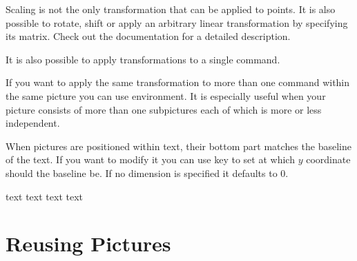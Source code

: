 Scaling is not the only transformation that can be applied to points. It is
also possible to rotate, shift or apply an arbitrary linear transformation by
specifying its matrix. Check out the documentation for a detailed description.
\begin{example}
\end{example}
It is also possible to apply transformations to a single command.
\begin{example}
\end{example}
If you want to apply the same transformation to more than one command within
the same picture you can use  environment. It is especially useful
when your picture consists of more than one subpictures each of which is more
or less independent.
\begin{example}[vertical_mode, examplewidth=0.7\linewidth]
\end{example}

When \TikZ{} pictures are positioned within text, their bottom part matches the
baseline of the text. If you want to modify it you can use  key
to set at which \(y\) coordinate should the baseline be. If no dimension is
specified it defaults to \(0\).
\begin{example}[vertical_mode, examplewidth=0.8\linewidth]
text 
text 
text  text
\end{example}

\section{Reusing Pictures}

